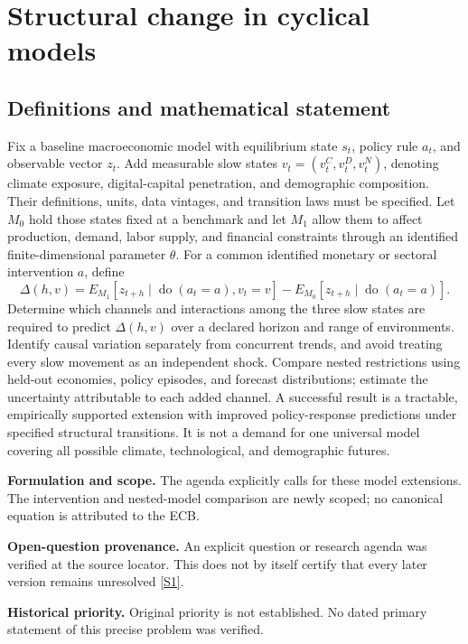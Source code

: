 \documentclass[11pt]{article}
\newcommand{\sref}[2]{\hyperlink{source:#1:#2}{[S#2]}}
\begin{document}
\section*{Structural change in cyclical models}\label{30007521}
\subsection{Definitions and mathematical statement}
Fix a baseline macroeconomic model with equilibrium state \(s_t\), policy rule \(a_t\), and observable vector \(z_t\). Add measurable slow states \(v_t=(v_t^C,v_t^D,v_t^N)\), denoting climate exposure, digital-capital penetration, and demographic composition. Their definitions, units, data vintages, and transition laws must be specified. Let \(M_0\) hold those states fixed at a benchmark and let \(M_1\) allow them to affect production, demand, labor supply, and financial constraints through an identified finite-dimensional parameter \(\theta\).
For a common identified monetary or sectoral intervention \(a\), define
\[
\Delta(h,v)=E_{M_1}[z_{t+h}\mid\operatorname{do}(a_t=a),v_t=v]
-E_{M_0}[z_{t+h}\mid\operatorname{do}(a_t=a)].
\]
Determine which channels and interactions among the three slow states are required to predict \(\Delta(h,v)\) over a declared horizon and range of environments. Identify causal variation separately from concurrent trends, and avoid treating every slow movement as an independent shock. Compare nested restrictions using held-out economies, policy episodes, and forecast distributions; estimate the uncertainty attributable to each added channel. A successful result is a tractable, empirically supported extension with improved policy-response predictions under specified structural transitions. It is not a demand for one universal model covering all possible climate, technological, and demographic futures.

\par\textbf{Formulation and scope.} The agenda explicitly calls for these model extensions. The intervention and nested-model comparison are newly scoped; no canonical equation is attributed to the ECB.

\par\textbf{Open-question provenance.} An explicit question or research agenda was verified at the source locator. This does not by itself certify that every later version remains unresolved \sref{30007521}{1}.

\par\textbf{Historical priority.} Original priority is not established. No dated primary statement of this precise problem was verified.
\end{document}
